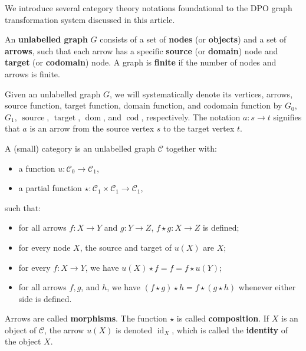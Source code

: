  We introduce several category theory notations foundational to the DPO graph transformation system discussed in this article.

\begin{definition} 
    An \textbf{unlabelled graph} \(G\) consists of a set of \textbf{nodes} (or \textbf{objects}) and a set of \textbf{arrows}, such that each arrow has a specific \textbf{source} (or \textbf{domain}) node and \textbf{target} (or \textbf{codomain}) node. A graph is \textbf{finite} if the number of nodes and arrows is finite.

    Given an unlabelled graph \(G\), we will systematically denote its vertices, arrows, source function, target function, domain function, and codomain function by \(G_0\), \(G_1\), \(\operatorname{source}\), \(\operatorname{target}\), \(\operatorname{dom}\), and \(\operatorname{cod}\), respectively. The notation \(a: s \to t\) signifies that \(a\) is an arrow from the source vertex \(s\) to the target vertex \(t\).
\end{definition}

\begin{definition}
    A (small) category is an unlabelled graph \(\mathcal{C}\) together with:
    \begin{itemize}
        \item a function \(u : \mathcal{C}_0 \to \mathcal{C}_1\),
        \item a partial function \(\star : \mathcal{C}_1 \times \mathcal{C}_1 \to \mathcal{C}_1\),
    \end{itemize}
    such that:
    \begin{itemize}
        \item for all arrows \(f:X \rightarrow Y\) and \(g:Y \rightarrow Z\), \(f \star g :X \to Z\) is defined;
        \item for every node \(X\), the source and target of \(u(X)\) are \(X\);
        \item for every \(f:X \rightarrow Y\), we have \(u(X) \star f = f = f \star u(Y)\);
        \item for all arrows \(f, g\), and \(h\), we have \((f \star g) \star h = f \star (g \star h)\) whenever either side is defined.
    \end{itemize}
 
    Arrows are called \textbf{morphisms}. The function $\star$ is called \textbf{composition}. If $X$ is an object of $\mathcal{C}$, the arrow $u(X)$ is denoted $\operatorname{id}_X$, which is called the \textbf{identity} of the object $X$. 
\end{definition}

